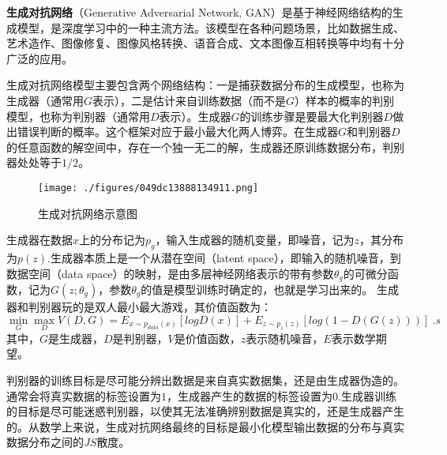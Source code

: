 

\textbf{生成对抗网络}（Generative Adversarial Network, GAN）是基于神经网络结构的生成模型，是深度学习中的一种主流方法。该模型在各种问题场景，比如数据生成、艺术造作、图像修复、图像风格转换、语音合成、文本图像互相转换等中均有十分广泛的应用。

生成对抗网络模型主要包含两个网络结构：一是捕获数据分布的生成模型，也称为生成器（通常用$G$表示），二是估计来自训练数据（而不是$G$）样本的概率的判别模型，也称为判别器（通常用$D$表示）。生成器$G$的训练步骤是要最大化判别器$D$做出错误判断的概率。这个框架对应于最小最大化两人博弈。在生成器$G$和判别器$D$的任意函数的解空间中，存在一个独一无二的解，生成器还原训练数据分布，判别器处处等于$1/2$。

\begin{figure}[ht]
\centering
\texttt{[image: ./figures/049dc13888134911.png]}
\caption{生成对抗网络示意图} \label{fig_GAN_2}
\end{figure}

生成器在数据$x$上的分布记为$p_g$，输入生成器的随机变量，即噪音，记为$z$，其分布为$p(z)$.生成器本质上是一个从潜在空间（latent space），即输入的随机噪音，到数据空间（data space）的映射，是由多层神经网络表示的带有参数$\theta_g$的可微分函数，记为$G(z;\theta_g)$，参数$\theta_g$的值是模型训练时确定的，也就是学习出来的。
生成器和判别器玩的是双人最小最大游戏，其价值函数为：
\begin{equation}
\mathop{\min}\limits_G \mathop {\max }\limits_D V(D,G)=E_{x\sim p_{data}(x)}[logD(x)]+E_{z\sim p_z(z)}[log(1-D(G(z)))]~.s
\end{equation}
其中，$G$是生成器，$D$是判别器，$V$是价值函数，$z$表示随机噪音，$E$表示数学期望。


判别器的训练目标是尽可能分辨出数据是来自真实数据集，还是由生成器伪造的。通常会将真实数据的标签设置为$1$，生成器产生的数据的标签设置为$0$.生成器训练的目标是尽可能迷惑判别器，以使其无法准确辨别数据是真实的，还是生成器产生的。从数学上来说，生成对抗网络最终的目标是最小化模型输出数据的分布与真实数据分布之间的$JS$散度。

